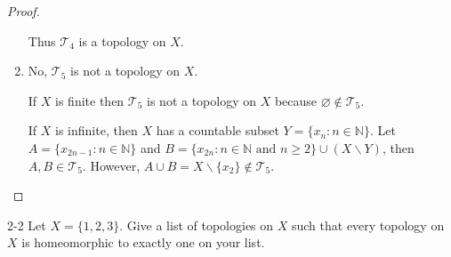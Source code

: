 \begin{proof}
\begin{enumerate}[label={(\alph*)}]
		      Thus $\mathscr{T}_{4}$ is a topology on $X$.
		\item No, $\mathscr{T}_{5}$ is not a topology on $X$.

		      If $X$ is finite then $\mathscr{T}_{5}$ is not a topology on $X$ because $\varnothing\notin\mathscr{T}_{5}$.

		      If $X$ is infinite, then $X$ has a countable subset $Y = \{ x_{n} : n\in\mathbb{N} \}$. Let $A = \{ x_{2n-1}: n\in\mathbb{N} \}$ and $B = \{ x_{2n} : n\in\mathbb{N} \text{ and } n\geq 2 \}\cup (X\smallsetminus Y)$, then $A, B\in\mathscr{T}_{5}$. However, $A\cup B = X\smallsetminus\{x_{2}\}\notin \mathscr{T}_{5}$.
	\end{enumerate}
\end{proof}

\begin{problem}{2-2}
Let $X = \{ 1, 2, 3 \}$. Give a list of topologies on $X$ such that every topology on $X$ is homeomorphic to exactly one on your list.
\end{problem}

